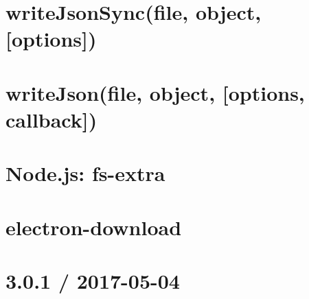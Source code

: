 \documentclass[twoside]{book}
\newcommand{\+}{\discretionary{\mbox{\scriptsize$\hookleftarrow$}}{}{}}
\begin{document}
\chapter{write\+Json\+Sync(file, object, \mbox{[}options\mbox{]})}
\label{md_dsmacc_examples_DRmerge_node_modules_electron-packager_node_modules_electron-download_node_mo8f7282cf1cdfe6c2a973eca428277a75}

\chapter{write\+Json(file, object, \mbox{[}options, callback\mbox{]})}
\label{md_dsmacc_examples_DRmerge_node_modules_electron-packager_node_modules_electron-download_node_modules_fs-extra_docs_writeJson}

\chapter{Node.\+js\+: fs-\/extra}
\label{md_dsmacc_examples_DRmerge_node_modules_electron-packager_node_modules_electron-download_node_modules_fs-extra_README}

\chapter{electron-\/download}
\label{md_dsmacc_examples_DRmerge_node_modules_electron-packager_node_modules_electron-download_readme}

\chapter{3.0.1 / 2017-\/05-\/04}
\label{md_dsmacc_examples_DRmerge_node_modules_electron-packager_node_modules_fs-extra_CHANGELOG}

\end{document}
